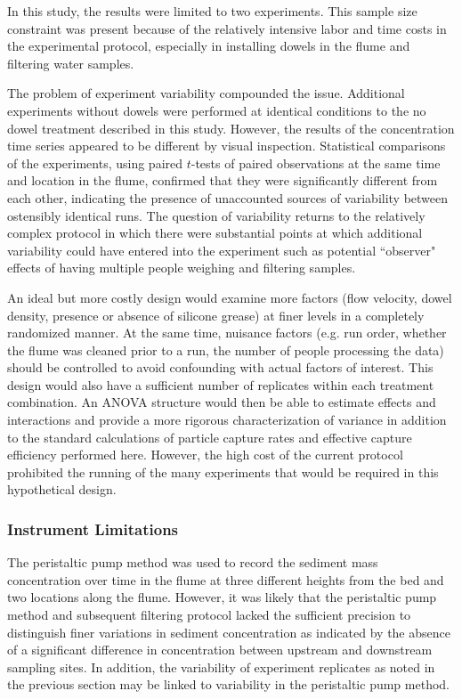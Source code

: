 \documentclass[12pt]{article}
\begin{document}
In this study, the results were limited to two experiments. This sample size constraint was present because of the relatively intensive labor and time costs in the experimental protocol, especially in installing dowels in the flume and filtering water samples.

The problem of experiment variability compounded the issue. Additional experiments without dowels were performed at identical conditions to the no dowel treatment described in this study. However, the results of the concentration time series appeared to be different by visual inspection. Statistical comparisons of the experiments, using paired $t$-tests of paired observations at the same time and location in the flume, confirmed that they were significantly different from each other, indicating the presence of unaccounted sources of variability between ostensibly identical runs. The question of variability returns to the relatively complex protocol in which there were substantial points at which additional variability could have entered into the experiment such as potential ``observer" effects of having multiple people weighing and filtering samples.

An ideal but more costly design would examine more factors (flow velocity, dowel density, presence or absence of silicone grease) at finer levels in a completely randomized manner. At the same time, nuisance factors (e.g. run order, whether the flume was cleaned prior to a run, the number of people processing the data) should be controlled to avoid confounding with actual factors of interest. This design would also have a sufficient number of replicates within each treatment combination. An ANOVA structure would then be able to estimate effects and interactions and provide a more rigorous characterization of variance in addition to the standard calculations of particle capture rates and effective capture efficiency performed here. However, the high cost of the current protocol prohibited the running of the many experiments that would be required in this hypothetical design.

\subsubsection{Instrument Limitations}

The peristaltic pump method was used to record the sediment mass concentration over time in the flume at three different heights from the bed and two locations along the flume. However, it was likely that the peristaltic pump method and subsequent filtering protocol lacked the sufficient precision to distinguish finer variations in sediment concentration as indicated by the absence of a significant difference in concentration between upstream and downstream sampling sites. In addition, the variability of experiment replicates as noted in the previous section may be linked to variability in the peristaltic pump method.
\end{document}
